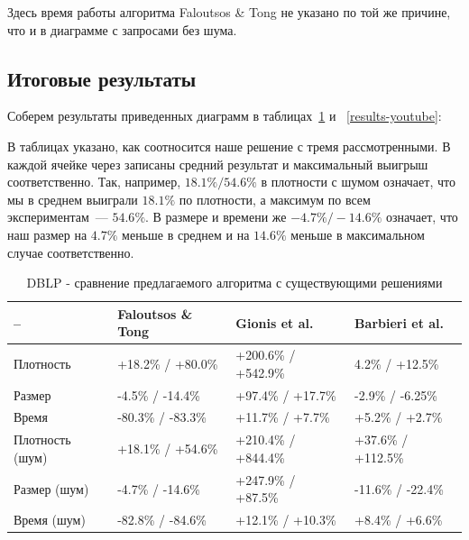 Здесь время работы алгоритма Faloutsos \& Tong \cite{Faloutsos06} не указано по той же причине, что и в диаграмме с запросами без шума.

\subsection{Итоговые результаты}

Соберем результаты приведенных диаграмм в таблицах~\ref{results-dblp} и ~\ref{results-youtube}:

В таблицах указано, как соотносится наше решение с тремя рассмотренными. В каждой ячейке через записаны средний результат и максимальный выигрыш соответственно. Так, например, $18.1\%/54.6\%$ в плотности с шумом означает, что мы в среднем выиграли $18.1\%$ по плотности, а максимум по всем экспериментам~--- $54.6\%$. В размере и времени же $-4.7\%/-14.6\%$ означает, что наш размер на $4.7\%$ меньше в среднем и на $14.6\%$ меньше в максимальном случае соответственно.

\begin{table}[!h]
\centering
\caption{DBLP - сравнение предлагаемого алгоритма с существующими решениями}\label{results-dblp}
  \begin{tabular}{| l | l | l | p{4cm} |}
  \hline
  -- & Faloutsos \& Tong & Gionis et al. & Barbieri et al. \\\hline
  Плотность       & +18.2\% / +80.0\% & +200.6\% / +542.9\% & 4.2\%   / +12.5\%  \\\hline
  Размер          & -4.5\%  / -14.4\% & +97.4\%  / +17.7\%  & -2.9\%  / -6.25\%  \\\hline
  Время           & -80.3\% / -83.3\% & +11.7\%  / +7.7\%   & +5.2\%  / +2.7\%   \\\hline
  Плотность (шум) & +18.1\% / +54.6\% & +210.4\% / +844.4\% & +37.6\% / +112.5\% \\\hline
  Размер (шум)    & -4.7\%  / -14.6\% & +247.9\% / +87.5\%  & -11.6\% / -22.4\%  \\\hline
  Время (шум)     & -82.8\% / -84.6\% & +12.1\%  / +10.3\%  & +8.4\%  / +6.6\%   \\\hline
  \end{tabular}
\end{table}
\FloatBarrier

